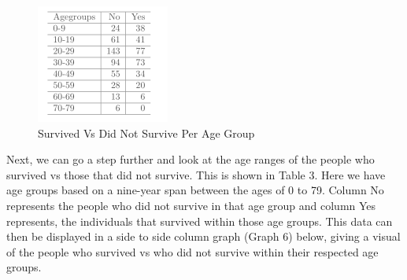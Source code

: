 \documentclass[sigconf]{acmart}
\begin{document}
\begin{figure}[htb]
  \centering
  \includegraphics[width=1.0\columnwidth]{paper2/Table 3.png}
  \caption{Survived Vs Did Not Survive Per Age Group
  \cite{Tibenkana and Driscoll, Data Set from Kaggle}}
  \label{fig:Table 3} 
\end{figure}

Next, we can go a step further and look at the age ranges of the people who survived vs those that did not survive. This is shown in Table 3. Here we have age groups based on a nine-year span between the ages of 0 to 79. Column No represents the people who did not survive in that age group and column Yes represents, the individuals that survived within those age groups. This data can then be displayed in a side to side column graph (Graph 6) below, giving a visual of the people who survived vs who did not survive within their respected age groups.
\end{document}
